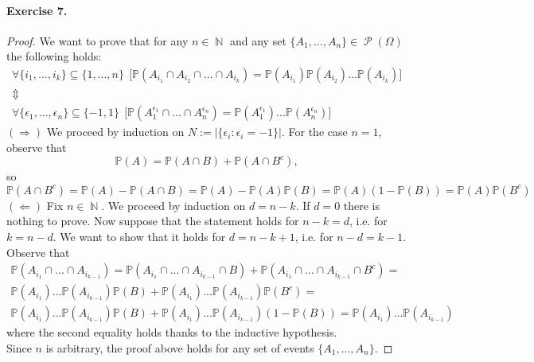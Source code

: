 \documentclass[12pt,a4paper]{report}
\theoremstyle{definition}
\theoremstyle{num.custom-title}
\DeclareMathOperator{\PP}{\mathcal{P}}
\DeclareMathOperator{\N}{\mathbb{N}}
\DeclareMathOperator{\sse}{\subseteq}
\renewcommand{\P}{\mathbb{P}}
\renewcommand{\1}{\mathbbm{1}}
\begin{document}
\paragraph{Exercise 7.} 
\begin{proof}
We want to prove that for any $n \in \N$ and any set $\{A_1,...,A_n\} \in \PP(\Omega)$ the following holds:
\begin{multline*}
\forall \{i_1,...,i_k\} \sse \{1,...,n\} \ \ \big[ \P(A_{i_1} \cap A_{i_2} \cap ... \cap A_{i_k}) = \P(A_{i_1}) \P(A_{i_2}) ... \P(A_{i_k}) \big] \\ 
\Updownarrow \\ 
\forall \{\epsilon_1,...,\epsilon_n\} \sse \{-1,1\} \ \ \big[ \P(A_1^{\epsilon_1} \cap ... \cap A_n^{\epsilon_n}) = \P(A_1^{\epsilon_1}) ... \P(A_n^{\epsilon_n}) \big]
\end{multline*}
$(\Longrightarrow)$ We proceed by induction on $N:=|\{\epsilon_i : \epsilon_i=-1\}|$. For the case $n=1$, observe that 
\[
\P(A)=\P(A \cap B) + \P(A \cap B^c),
\]
so
\[
\P(A \cap B^c)=\P(A)-\P(A \cap B)= \P(A)-\P(A) \P(B) =\P(A)(1-\P(B))=\P(A)\P(B^c)
\]
$(\Longleftarrow)$ Fix $n \in \N$. We proceed by induction on $d=n-k$.
If $d=0$ there is nothing to prove. Now suppose that the statement holds for $n-k=d$, i.e. for $k=n-d$. We want to show that it holds for $d=n-k+1$, i.e. for $n-d=k-1$. Observe that
\begin{multline*}
\P(A_{i_1} \cap ... \cap A_{i_{k-1}}) = \P(A_{i_1} \cap ... \cap A_{i_{k-1}} \cap B) + \P(A_{i_1} \cap ... \cap A_{i_{k-1}} \cap B^c) = \\
\P(A_{i_1}) ... \P(A_{i_{k-1}}) \P(B) + \P(A_{i_1}) ... \P(A_{i_{k-1}}) \P(B^c) = \\
\P(A_{i_1}) ... \P(A_{i_{k-1}}) \P(B) + \P(A_{i_1}) ... \P(A_{i_{k-1}}) (1-\P(B)) =  \P(A_{i_1}) ... \P(A_{i_{k-1}})
\end{multline*}
where the second equality holds thanks to the inductive hypothesis.\\
Since $n$ is arbitrary, the proof above holds for any set of events $\{A_1,...,A_n\}$.


\end{proof}
\end{document}
